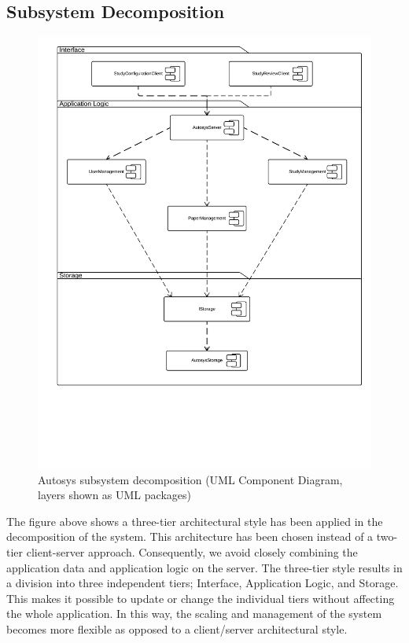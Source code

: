\subsection{Subsystem Decomposition}
\begin{figure}[H]
	\includegraphics[width = \linewidth]{UMLComponentDiagramSubsystems}
	\caption{Autosys subsystem decomposition (UML Component Diagram, layers shown as UML packages)}
	\label{fig:Subsystem Decomposition, UML Component Diagram}
\end{figure}
The figure above shows a three-tier architectural style has been applied in the decomposition of the system. This architecture has been chosen instead of a two-tier client-server approach. Consequently, we avoid closely combining the application data and application logic on the server. The three-tier style results in a division into three independent tiers; Interface, Application Logic, and Storage. This makes it possible to update or change the individual tiers without affecting the whole application. In this way, the scaling and management of the system becomes more flexible as opposed to a client/server architectural style.
